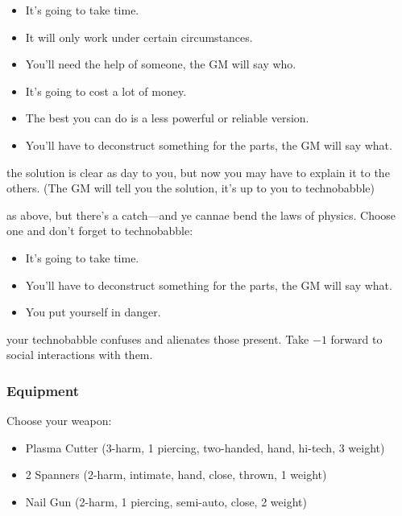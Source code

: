 \begin{itemize}
\item It's going to take time.
\item It will only work under certain circumstances.
\item You'll need the help of someone, the GM will say who.
\item It's going to cost a lot of money.
\item The best you can do is a less powerful or reliable version.
\item You’ll have to deconstruct something for the parts, the GM will say what.
\end{itemize}

{the solution is clear as day to you, but now you may have to explain it to the others. (The GM will tell you the solution, it's up to you to technobabble)}
{as above, but there's a catch---and ye cannae bend the laws of physics. Choose one and don't forget to technobabble:
\begin{itemize}
\item It's going to take time.
\item You’ll have to deconstruct something for the parts, the GM will say what.
\item You put yourself in danger.
\end{itemize}}
{your technobabble confuses and alienates those present. Take $-1$ forward to social interactions with them.}


\subsubsection{Equipment}
Choose your weapon:
\begin{itemize}
\item Plasma Cutter (3-harm, 1 piercing, two-handed, hand, hi-tech, 3 weight)
\item 2 Spanners (2-harm, intimate, hand, close, thrown, 1 weight)
\item Nail Gun (2-harm, 1 piercing, semi-auto, close, 2 weight)
\end{itemize}

